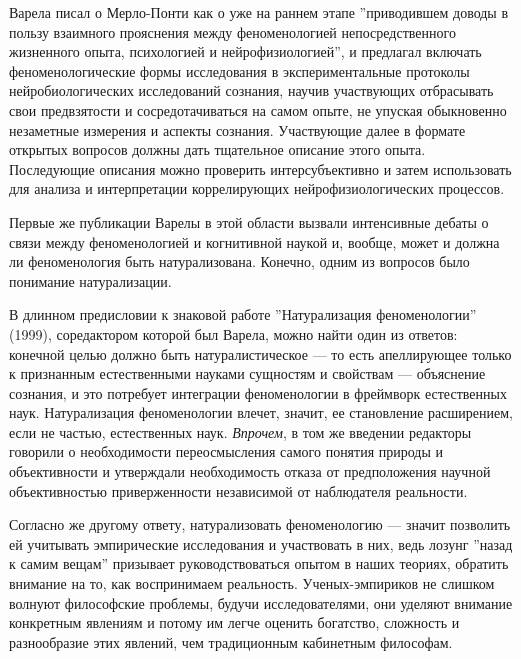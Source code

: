 \documentclass[11pt]{book}
\begin{document}
Варела писал о Мерло-Понти как о уже на раннем этапе ''приводившем доводы в пользу взаимного прояснения между феноменологией непосредственного жизненного опыта, психологией и нейрофизиологией'', и предлагал включать феноменологические формы исследования в экспериментальные протоколы нейробиологических исследований сознания, научив участвующих отбрасывать свои предвзятости и сосредотачиваться на самом опыте, не упуская обыкновенно незаметные измерения и аспекты сознания. Участвующие далее в формате открытых вопросов должны дать тщательное описание этого опыта. Последующие описания можно проверить интерсубъективно и затем использовать для анализа и интерпретации коррелирующих нейрофизиологических процессов.

Первые же публикации Варелы в этой области вызвали интенсивные дебаты о связи между феноменологией и когнитивной наукой и, вообще, может и должна ли феноменология быть натурализована. Конечно, одним из вопросов было понимание натурализации.

В длинном предисловии к знаковой работе ''Натурализация феноменологии'' (1999), соредактором которой был Варела, можно найти один из ответов: конечной целью должно быть натуралистическое --- то есть апеллирующее только к признанным естественными науками сущностям и свойствам --- объяснение сознания, и это потребует интеграции феноменологии в фреймворк естественных наук. Натурализация феноменологии влечет, значит, ее становление расширением, если не частью, естественных наук. \textit{Впрочем}, в том же введении редакторы говорили о необходимости переосмысления самого понятия природы и объективности и утверждали необходимость отказа от предположения научной объективностью приверженности независимой от наблюдателя реальности.

Согласно же другому ответу, натурализовать феноменологию --- значит позволить ей учитывать эмпирические исследования и участвовать в них, ведь лозунг ''назад к самим вещам'' призывает руководствоваться опытом в наших теориях, обратить внимание на то, как воспринимаем реальность. Ученых-эмпириков не слишком волнуют философские проблемы, будучи исследователями, они уделяют внимание конкретным явлениям и потому им легче оценить богатство, сложность и разнообразие этих явлений, чем традиционным кабинетным философам.
\end{document}
